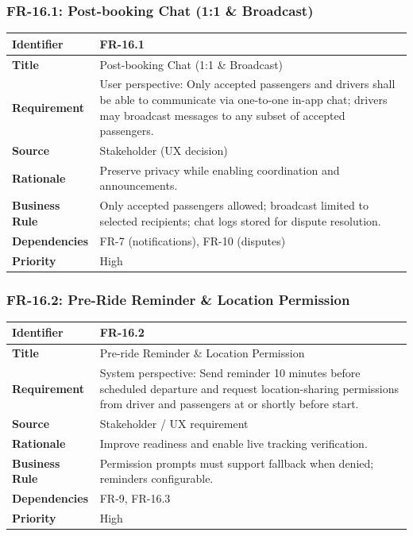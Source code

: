 \subsubsection{FR-16.1: Post-booking Chat (1:1 \& Broadcast)}

\begin{longtable}{|p{3cm}|p{12cm}|}
\hline
\rowcolor{lightgray!30}
\textbf{Identifier} & FR-16.1 \\
\hline
\textbf{Title} & Post-booking Chat (1:1 \& Broadcast) \\
\hline
\textbf{Requirement} & User perspective: Only accepted passengers and drivers shall be able to communicate via one-to-one in-app chat; drivers may broadcast messages to any subset of accepted passengers. \\
\hline
\textbf{Source} & Stakeholder (UX decision) \\
\hline
\textbf{Rationale} & Preserve privacy while enabling coordination and announcements. \\
\hline
\textbf{Business Rule} & Only accepted passengers allowed; broadcast limited to selected recipients; chat logs stored for dispute resolution. \\
\hline
\textbf{Dependencies} & FR-7 (notifications), FR-10 (disputes) \\
\hline
\textbf{Priority} & High \\
\hline
\end{longtable}

\subsubsection{FR-16.2: Pre-Ride Reminder \& Location Permission}

\begin{longtable}{|p{3cm}|p{12cm}|}
\hline
\rowcolor{lightgray!30}
\textbf{Identifier} & FR-16.2 \\
\hline
\textbf{Title} & Pre-ride Reminder \& Location Permission \\
\hline
\textbf{Requirement} & System perspective: Send reminder 10 minutes before scheduled departure and request location-sharing permissions from driver and passengers at or shortly before start. \\
\hline
\textbf{Source} & Stakeholder / UX requirement \\
\hline
\textbf{Rationale} & Improve readiness and enable live tracking verification. \\
\hline
\textbf{Business Rule} & Permission prompts must support fallback when denied; reminders configurable. \\
\hline
\textbf{Dependencies} & FR-9, FR-16.3 \\
\hline
\textbf{Priority} & High \\
\hline
\end{longtable}

